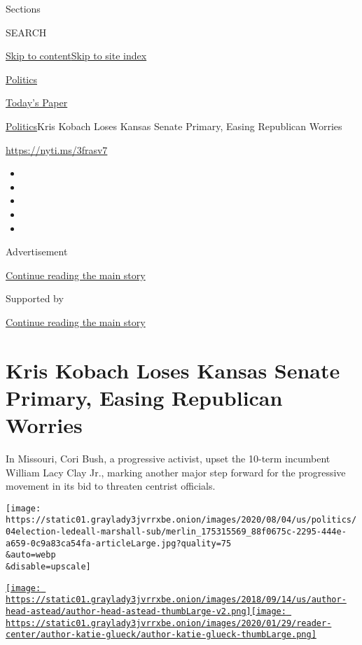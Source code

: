 Sections

SEARCH

\protect\hyperlink{site-content}{Skip to
content}\protect\hyperlink{site-index}{Skip to site index}

\href{https://www.nytimes3xbfgragh.onion/section/politics}{Politics}

\href{https://myaccount.nytimes3xbfgragh.onion/auth/login?response_type=cookie\&client_id=vi}{}

\href{https://www.nytimes3xbfgragh.onion/section/todayspaper}{Today's
Paper}

\href{/section/politics}{Politics}\textbar{}Kris Kobach Loses Kansas
Senate Primary, Easing Republican Worries

\href{https://nyti.ms/3frasv7}{https://nyti.ms/3frasv7}

\begin{itemize}
\item
\item
\item
\item
\item
\end{itemize}

Advertisement

\protect\hyperlink{after-top}{Continue reading the main story}

Supported by

\protect\hyperlink{after-sponsor}{Continue reading the main story}

\hypertarget{kris-kobach-loses-kansas-senate-primary-easing-republican-worries}{%
\section{Kris Kobach Loses Kansas Senate Primary, Easing Republican
Worries}\label{kris-kobach-loses-kansas-senate-primary-easing-republican-worries}}

In Missouri, Cori Bush, a progressive activist, upset the 10-term
incumbent William Lacy Clay Jr., marking another major step forward for
the progressive movement in its bid to threaten centrist officials.

\texttt{[image: https://static01.graylady3jvrrxbe.onion/images/2020/08/04/us/politics/04election-ledeall-marshall-sub/merlin\_175315569\_88f0675c-2295-444e-a659-0c9a83ca54fa-articleLarge.jpg?quality=75\\\&auto=webp\\\&disable=upscale]}

\href{https://www.nytimes3xbfgragh.onion/by/astead-w-herndon}{\texttt{[image: https://static01.graylady3jvrrxbe.onion/images/2018/09/14/us/author-head-astead/author-head-astead-thumbLarge-v2.png]}}\href{https://www.nytimes3xbfgragh.onion/by/katie-glueck}{\texttt{[image: https://static01.graylady3jvrrxbe.onion/images/2020/01/29/reader-center/author-katie-glueck/author-katie-glueck-thumbLarge.png]}}

